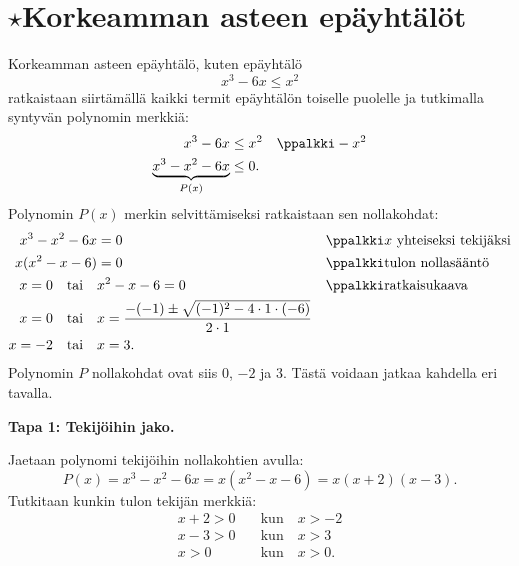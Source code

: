 \section{$\star$Korkeamman asteen epäyhtälöt}


Korkeamman asteen epäyhtälö, kuten epäyhtälö
\[
x^3 -6x \leq x^2
\]
ratkaistaan siirtämällä kaikki termit epäyhtälön toiselle puolelle ja tutkimalla syntyvän polynomin merkkiä:
\begin{align*}
x^3-6x & \leq x^2 & &\ppalkki -x^2 \\
\underbrace{x^3-x^2-6x}_{P(x)} &\leq 0. &&
\end{align*}
Polynomin $P(x)$ merkin selvittämiseksi ratkaistaan sen nollakohdat:
\begin{align*}
    x^3 - x^2-6x &= 0 & &\ppalkki \text{$x$ yhteiseksi tekijäksi} \\
    x(x^2 -x -6) &= 0 & &\ppalkki \text{tulon nollasääntö} \\
    x = 0 \quad \text{tai} \quad & x^2 -x -6 = 0 & &\ppalkki \text{ratkaisukaava} \\
    x= 0 \quad \text{tai} \quad & x=\frac{-(-1) \pm \sqrt{(-1)^2-4\cdot 1 \cdot (-6)}}{2\cdot 1} && \\
    x = -2 \quad \text{tai} \quad & x = 3. &&
\end{align*}
Polynomin $P$ nollakohdat ovat siis $0$, $-2$ ja $3$. Tästä voidaan jatkaa kahdella eri tavalla.

\textbf{Tapa 1: Tekijöihin jako.}

Jaetaan polynomi tekijöihin nollakohtien avulla:
\[
P(x) = x^3 - x^2-6x = x(x^2-x-6) = x(x+2)(x-3).
\]
Tutkitaan kunkin tulon tekijän merkkiä:
\begin{align*}
    x+2>0 & \quad \text{kun} \quad x > -2\\
    x-3>0 & \quad \text{kun} \quad x > 3\\
    x>0 & \quad \text{kun} \quad x > 0.
\end{align*}

